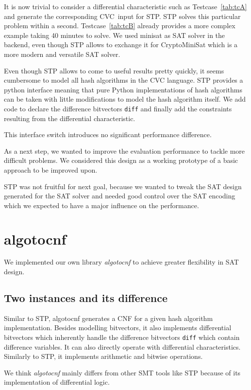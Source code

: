 It is now trivial to consider a differential characteristic such as Testcase~\ref{tab:tcA}
and generate the corresponding CVC~input for STP. STP solves this particular problem within
a second. Testcase~\ref{tab:tcB} already provides a more complex example taking
40 minutes to solve. We used minisat as SAT solver in the backend, even though STP
allows to exchange it for CryptoMiniSat which is a more modern and versatile SAT solver.

Even though STP allows to come to useful results pretty quickly,
it seems cumbersome to model all hash algorithms in the CVC language.
STP provides a python interface meaning that pure Python implementations
of hash algorithms can be taken with little modifications to model the
hash algorithm itself. We add code to declare the difference bitvectors
\texttt{diff} and finally add the constraints resulting from the differential
characteristic.

This interface switch introduces no significant performance difference.

As a next step, we wanted to improve the evaluation performance to tackle more difficult
problems. We considered this design as a working prototype of a basic approach to be
improved upon.

STP was not fruitful for next goal, because we wanted to tweak the SAT design generated
for the SAT solver and needed good control over the SAT encoding
which we expected to have a major influence on the performance.

\section{algotocnf}
\label{sec:enc-algotocnf}
%
We implemented our own library \emph{algotocnf} to achieve greater flexibility in SAT design.

\subsection{Two instances and its difference}
\label{sec:enc-original}
%
Similar to STP, algotocnf generates a CNF for a given hash algorithm implementation.
Besides modelling bitvectors, it also implements differential bitvectors which
inherently handle the difference bitvectors \texttt{diff} which contain difference
variables. It can also directly operate with differential characteristics.
Similarly to STP, it implements arithmetic and bitwise operations.

We think \emph{algotocnf} mainly differs from other SMT tools like STP
because of its implementation of differential logic.

